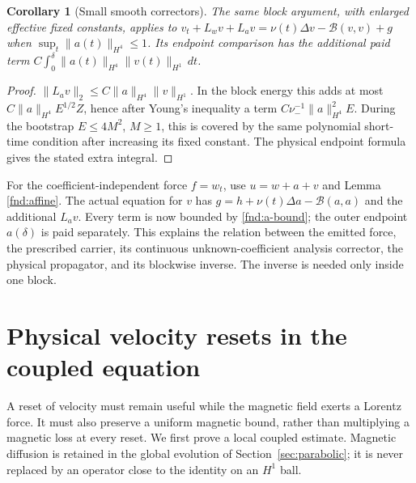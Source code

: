 \documentclass[11pt,a4paper]{amsart}
\newtheorem{corollary}[theorem]{Corollary}
\theoremstyle{definition}
\theoremstyle{remark}
\numberwithin{equation}{section}
\newcommand{\Bcal}{\mathcal B}
\begin{document}
\begin{corollary}[Small smooth correctors]\label{fnd:small-corrector}
The same block argument, with enlarged effective fixed constants, applies to
$v_t+L_wv+L_av=\nu(t)\Delta v-\Bcal(v,v)+g$ when
$\sup_t\|a(t)\|_{H^4}\le1$. Its endpoint comparison has the additional paid
term $C\int_0^\delta\|a(t)\|_{H^4}\|v(t)\|_{H^1}\,dt$.
\end{corollary}
\begin{proof}
$\|L_av\|_2\le C\|a\|_{H^4}\|v\|_{H^1}$. In the block energy this adds at
most $C\|a\|_{H^4}E^{1/2}Z$, hence after Young's inequality a term
$C\nu_-^{-1}\|a\|_{H^4}^2E$. During the bootstrap $E\le4M^2$, $M\ge1$,
this is covered by the same polynomial short-time condition after increasing
its fixed constant. The physical endpoint formula gives the stated extra
integral.
\end{proof}

For the coefficient-independent force $f=w_t$, use
$u=w+a+v$ and Lemma \ref{fnd:affine}. The actual equation for $v$ has
$g=h+\nu(t)\Delta a-\Bcal(a,a)$ and the additional $L_av$. Every term is now
bounded by \eqref{fnd:a-bound}; the outer endpoint $a(\delta)$ is paid
separately. This explains the relation between the emitted force, the
prescribed carrier, its continuous unknown-coefficient analysis corrector, the
physical propagator, and its blockwise inverse. The inverse is needed only
inside one block.



\section{Physical velocity resets in the coupled equation}\label{sec:reset}
A reset of velocity must remain useful while the magnetic field exerts a Lorentz force. It must also preserve a uniform magnetic bound, rather than multiplying a magnetic loss at every reset. We first prove a local coupled estimate. Magnetic diffusion is retained in the global evolution of Section~\ref{sec:parabolic}; it is never replaced by an operator close to the identity on an $H^1$ ball.
\end{document}
